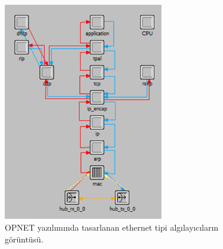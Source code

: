 \begin{figure}[htbp]


\centerline{\includegraphics[width=7cm]{Resim/Sekil4-9.png}}
\caption{OPNET yazılımında tasarlanan ethernet tipi algılayıcıların görüntüsü.}
\label{fig:4-9}
\end{figure}

